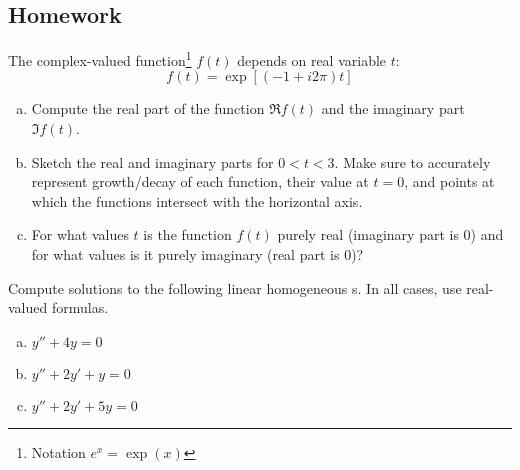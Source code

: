 \subsection*{Homework}


\begin{question}
  The complex-valued function\footnote{Notation \(e^{x} = \exp(x)\)}  \(f(t)\) depends on real variable \(t\):
  \[
f(t) =    \exp\left[(-1+i2\pi)t\right]
\]
\begin{enumerate}[(a)]
\item Compute the real part of the function \(\Re f(t)\) and the imaginary part \(\Im f(t)\). \solspace{1.5in}
  \item Sketch the real and imaginary parts for \(0 < t < 3\). Make sure to accurately represent growth/decay of each function, their value at \(t=0\), and points at which the functions intersect with the horizontal axis.

  \item For what values \(t\) is the function \(f(t)\) purely real (imaginary part is 0) and for what values is it purely imaginary (real part is \(0\))?

  \vspace{1em}

   \quad {}
\end{enumerate}
\end{question}

\begin{question}
  Compute solutions to the following linear homogeneous \ode{}s. In all cases, use real-valued formulas.
  \begin{enumerate}[(a)]
  \item \(y'' + 4y = 0\) \solspace{1in}
  \item \(y''+2y'+y = 0 \) \solspace{1in}
  \item \(y''+2y' + 5y = 0\) \solspace{1in}
  \end{enumerate}
\end{question}

